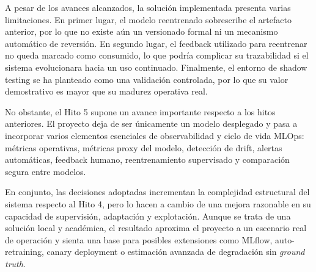 A pesar de los avances alcanzados, la solución implementada presenta varias limitaciones. En primer lugar, el modelo reentrenado sobrescribe el artefacto anterior, por lo que no existe aún un versionado formal ni un mecanismo automático de reversión. En segundo lugar, el feedback utilizado para reentrenar no queda marcado como consumido, lo que podría complicar su trazabilidad si el sistema evolucionara hacia un uso continuado. Finalmente, el entorno de shadow testing se ha planteado como una validación controlada, por lo que su valor demostrativo es mayor que su madurez operativa real.

No obstante, el Hito 5 supone un avance importante respecto a los hitos anteriores. El proyecto deja de ser únicamente un modelo desplegado y pasa a incorporar varios elementos esenciales de observabilidad y ciclo de vida MLOps: métricas operativas, métricas proxy del modelo, detección de drift, alertas automáticas, feedback humano, reentrenamiento supervisado y comparación segura entre modelos.

En conjunto, las decisiones adoptadas incrementan la complejidad estructural del sistema respecto al Hito 4, pero lo hacen a cambio de una mejora razonable en su capacidad de supervisión, adaptación y explotación. Aunque se trata de una solución local y académica, el resultado aproxima el proyecto a un escenario real de operación y sienta una base para posibles extensiones como MLflow, auto-retraining, canary deployment o estimación avanzada de degradación sin \textit{ground truth}.